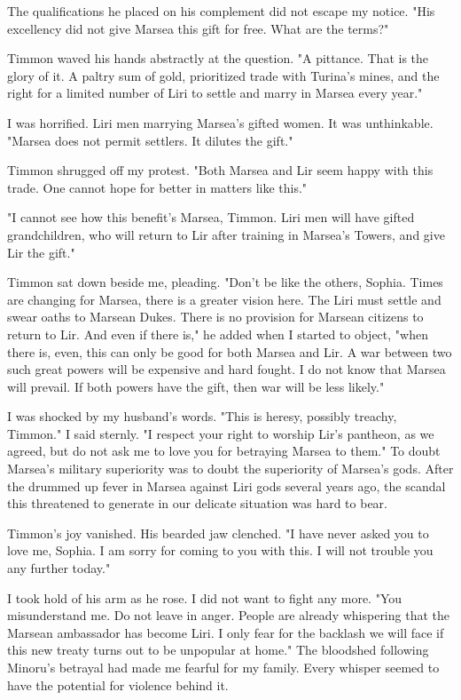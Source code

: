 \documentclass{article}
\begin{document}
The qualifications he placed on his complement did not escape my notice. "His excellency did not give Marsea this gift for free. What are the terms?"

Timmon waved his hands abstractly at the question. "A pittance. That is the glory of it. A paltry sum of gold, prioritized trade with Turina's mines, and the right for a limited number of Liri to settle and marry in Marsea every year."

I was horrified. Liri men marrying Marsea's gifted women. It was unthinkable. "Marsea does not permit settlers. It dilutes the gift."

Timmon shrugged off my protest. "Both Marsea and Lir seem happy with this trade. One cannot hope for better in matters like this." 

"I cannot see how this benefit's Marsea, Timmon. Liri men will have gifted grandchildren, who will return to Lir after training in Marsea's Towers, and give Lir the gift."

Timmon sat down beside me, pleading. "Don't be like the others, Sophia. Times are changing for Marsea, there is a greater vision here. The Liri must settle and swear oaths to Marsean Dukes. There is no provision for Marsean citizens to return to Lir. And even if there is," he added when I started to object, "when there is, even, this can only be good for both Marsea and Lir. A war between two such great powers will be expensive and hard fought. I do not know that Marsea will prevail. If both powers have the gift, then war will be less likely."

I was shocked by my husband's words. "This is heresy, possibly treachy, Timmon." I said sternly. "I respect your right to worship Lir's pantheon, as we agreed, but do not ask me to love you for betraying Marsea to them." To doubt Marsea's military superiority was to doubt the superiority of Marsea's gods. After the drummed up fever in Marsea against Liri gods several years ago, the scandal this threatened to generate in our delicate situation was hard to bear.

Timmon's joy vanished. His bearded jaw clenched. "I have never asked you to love me, Sophia. I am sorry for coming to you with this. I will not trouble you any further today." 

I took hold of his arm as he rose. I did not want to fight any more. "You misunderstand me. Do not leave in anger. People are already whispering that the Marsean ambassador has become Liri. I only fear for the backlash we will face if this new treaty turns out to be unpopular at home." The bloodshed following Minoru's betrayal had made me fearful for my family. Every whisper seemed to have the potential for violence behind it.
\end{document}
